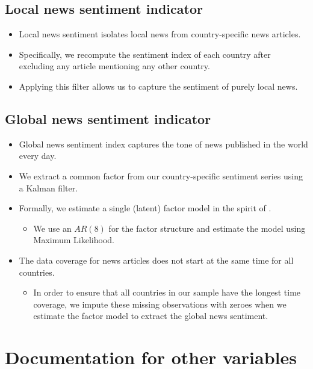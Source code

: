 \documentclass[11pt, fleqn]{article}
\begin{document}
\subsection{Local news sentiment indicator}

\begin{itemize}
\item Local news sentiment isolates local news from country-specific news articles.
\item Specifically, we recompute the sentiment index of each country after excluding any article mentioning any other country.
\item Applying this filter allows us to capture the sentiment of purely local news.
\end{itemize}

\subsection{Global news sentiment indicator}

\begin{itemize}
\item Global news sentiment index captures the tone of news published in the world every day.
\item We extract a common factor from our country-specific sentiment series using a Kalman filter.
\item Formally, we estimate a single (latent) factor model in the spirit of \cite{STOCK2016415}.
\begin{itemize}
\item We use an $AR(8)$ for the factor structure and estimate the model using Maximum Likelihood.
\end{itemize}
\item The data coverage for news articles does not start at the same time for all countries.
\begin{itemize}
\item In order to ensure that all countries in our sample have the longest time coverage, we impute these missing observations with zeroes when we estimate the factor model to extract the global news sentiment.
\end{itemize}
\end{itemize}

\section{Documentation for other variables}
\end{document}
